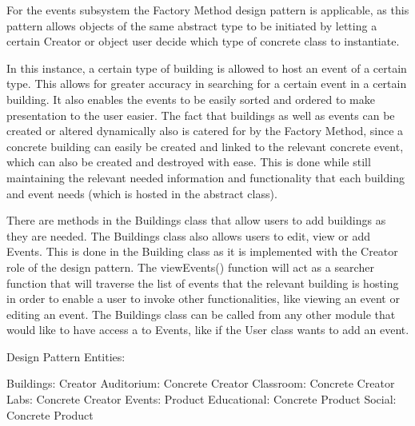 \documentclass{article}
\begin{document}
    \begin{flushleft}
    
        For the events subsystem the Factory Method design pattern is applicable, as this pattern allows objects of the same abstract type to be initiated by letting a certain Creator or object user decide which type of concrete class to instantiate.
        
        \bigskip
        
        In this instance, a certain type of building is allowed to host an event of a certain type. This allows for greater accuracy in searching for a certain event in a certain building. It also enables the events to be easily sorted and ordered to make presentation to the user easier. The fact that buildings as well as events can be created or altered dynamically also is catered for by the Factory Method, since a concrete building can easily be created and linked to the relevant concrete event, which can also be created and destroyed with ease. This is done while still maintaining the relevant needed information and functionality that each building and event needs (which is hosted in the abstract class).
        
        \bigskip
        
        There are methods in the Buildings class that allow users to add buildings as they are needed. The Buildings class also allows users to edit, view or add Events. This is done in the Building class as it is implemented with the Creator role of the design pattern. The viewEvents() function will act as a searcher function that will traverse the list of events that the relevant building is hosting in order to enable a user to invoke other functionalities, like  viewing an event or editing an event. The Buildings class can be called from any other module that would like to have access a to Events, like if the User class wants to add an event.
        
        \bigskip
        Design Pattern Entities:
        \bigskip
        
        Buildings: Creator
        \newline
        Auditorium: Concrete Creator
        \newline
        Classroom: Concrete Creator
        \newline
        Labs: Concrete Creator
        \newline
        Events: Product
        \newline
        Educational: Concrete Product
        \newline
        Social: Concrete Product
        
    \end{flushleft}
    
\end{document}
